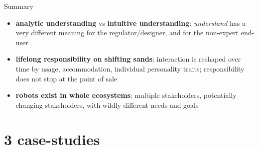 \documentclass[xcolor=table,aspectratio=169]{beamer}
\begin{document}
\begin{frame}{Summary}
    \begin{itemize}
        \item  \textbf{analytic understanding} vs \textbf{intuitive
            understanding}: \emph{understand} has a very different meaning for the
            regulator/designer, and for the non-expert end-user
        \item \textbf{lifelong responsibility on shifting sands}:
            interaction is reshaped over time by usage, accommodation,
            individual personality traits; responsibility does not stop at the
            point of sale
        \item \textbf{robots exist in whole ecosystems}: multiple
            stakeholders, potentially changing stakeholders, with wildly
            different needs and goals
    \end{itemize}
\end{frame}

\section*{3 case-studies}
\end{document}
